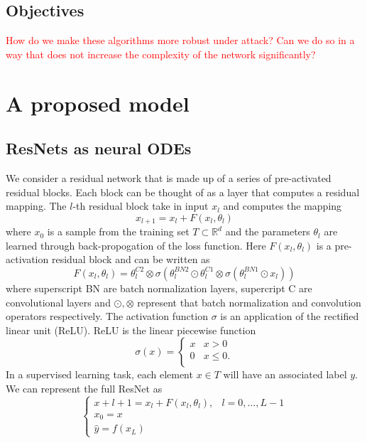 \documentclass[12pt]{article}
\begin{document}
\subsection{Objectives}
\textcolor{red}{How do we make these algorithms more robust under attack? Can we do so in a way that does not increase the complexity of the network significantly?}
\section{A proposed model}
\subsection{ResNets as neural ODEs}
We consider a residual network that is made up of a series of pre-activated residual blocks. Each block can be thought of as a layer that computes a residual mapping. The $l$-th residual block take in input $x_l$ and computes the mapping
$$ x_{l+1} = x_{l} + F(x_l,\theta_l)$$
where $x_0$ is a sample from the training set $T \subset \mathbb{R}^d $ and the parameters $\theta_l$ are learned through back-propogation of the loss function. Here $F(x_l,\theta_l)$ is a pre-activation residual block and can be written as
$$ F(x_l,\theta_l) =  \theta_l^{C2}\otimes\sigma(\theta_l^{BN2}\odot\theta_l^{C1}\otimes\sigma(\theta_l^{BN1}\odot x_l))$$
where superscript BN are batch normalization layers, supercript C are convolutional layers and $\odot, \otimes$ represent that batch normalization and convolution operators respectively. The activation function $\sigma$ is an application of the rectified linear unit (ReLU). ReLU is the linear piecewise function
\begin{equation*}
\sigma(x) = \begin{cases} x & x > 0 \\
 0 & x \leq 0. \\
\end{cases}
\end{equation*}
In a supervised learning task, each element $x \in T$ will have an associated label $y$. We can represent the full ResNet as
$$ \begin{cases}
x+{l+1} = x_l + F(x_l,\theta_l), & l=0,\dots,L-1 \\
x_0 = x \\
\hat y = f(x_L)
\end{cases} $$
\end{document}
